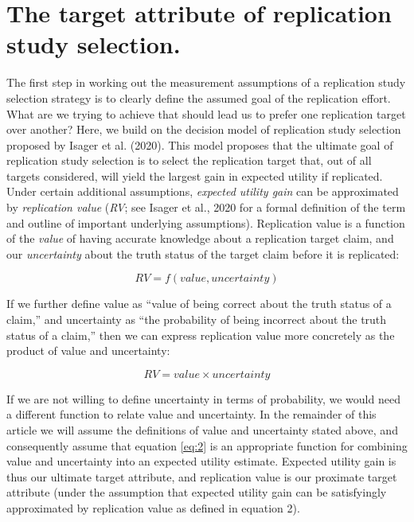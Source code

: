\documentclass[
  english,
  jou,floatsintext]{apa6}
\begin{document}
\hypertarget{the-target-attribute-of-replication-study-selection.}{%
\section{The target attribute of replication study selection.}\label{the-target-attribute-of-replication-study-selection.}}

The first step in working out the measurement assumptions of a replication study selection strategy is to clearly define the assumed goal of the replication effort. What are we trying to achieve that should lead us to prefer one replication target over another? Here, we build on the decision model of replication study selection proposed by Isager et al. (2020). This model proposes that the ultimate goal of replication study selection is to select the replication target that, out of all targets considered, will yield the largest gain in expected utility if replicated. Under certain additional assumptions, \emph{expected utility gain} can be approximated by \emph{replication value} (\emph{RV}; see Isager et al., 2020 for a formal definition of the term and outline of important underlying assumptions). Replication value is a function of the \emph{value} of having accurate knowledge about a replication target claim, and our \emph{uncertainty} about the truth status of the target claim before it is replicated:

\begin{equation} 
  \tag{1}
  RV=f(value, uncertainty)
  \label{eq:1}
\end{equation}

If we further define value as ``value of being correct about the truth status of a claim,'' and uncertainty as ``the probability of being incorrect about the truth status of a claim,'' then we can express replication value more concretely as the product of value and uncertainty:

\begin{equation} 
  \tag{2}
  RV=value\times uncertainty
  \label{eq:2}
\end{equation}

If we are not willing to define uncertainty in terms of probability, we would need a different function to relate value and uncertainty. In the remainder of this article we will assume the definitions of value and uncertainty stated above, and consequently assume that equation \eqref{eq:2} is an appropriate function for combining value and uncertainty into an expected utility estimate. Expected utility gain is thus our ultimate target attribute, and replication value is our proximate target attribute (under the assumption that expected utility gain can be satisfyingly approximated by replication value as defined in equation 2).
\end{document}
